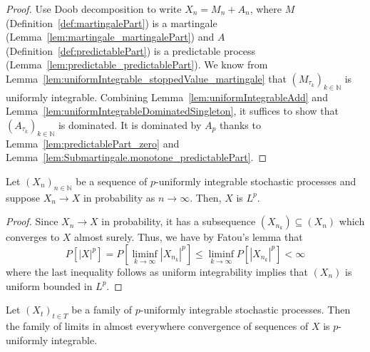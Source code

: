 \begin{proof}
Use Doob decomposition to write $X_n = M_n + A_n$, where $M$ (Definition~\ref{def:martingalePart}) is a martingale (Lemma~\ref{lem:martingale_martingalePart}) and $A$ (Definition~\ref{def:predictablePart}) is a predictable process (Lemma~\ref{lem:predictable_predictablePart}).
We know from Lemma~\ref{lem:uniformIntegrable_stoppedValue_martingale} that $(M_{\tau_k})_{k \in \mathbb{N}}$ is uniformly integrable. Combining Lemma~\ref{lem:uniformIntegrableAdd} and Lemma~\ref{lem:uniformIntegrableDominatedSingleton}, it suffices to show that $(A_{\tau_k})_{k \in \mathbb{N}}$ is dominated. It is dominated by $A_p$ thanks to Lemma~\ref{lem:predictablePart_zero} and Lemma~\ref{lem:Submartingale.monotone_predictablePart}.
\end{proof}

\begin{lemma}\label{lem:memLp_of_tendstoInMeasure}
  \mathlibok
  Let $(X_n)_{n \in \mathbb{N}}$ be a sequence of $p$-uniformly integrable stochastic processes and suppose $X_n \to X$
  in probability as $n \to \infty$. Then, $X$ is $L^p$.
\end{lemma}

\begin{proof}
  \mathlibok
  Since $X_n \to X$ in probability, it has a subsequence $(X_{n_k}) \subseteq (X_n)$ which converges
  to $X$ almost surely. Thus, we have by Fatou's lemma that
  \[P[|X|^p] = P[\liminf_{k \to \infty} |X_{n_k}|^p] \le \liminf_{k \to \infty} P[|X_{n_k}|^p] < \infty\]
  where the last inequality follows as uniform integrability implies that $(X_n)$ is uniform bounded in $L^p$.
\end{proof}

\begin{lemma}\label{lem:uniformIntegrable_of_tendsto_ae}
  \mathlibok
  Let $(X_t)_{t \in T}$ be a family of $p$-uniformly integrable stochastic processes. Then the family of limits in almost everywhere convergence of sequences of $X$ is $p$-uniformly integrable.
\end{lemma}

